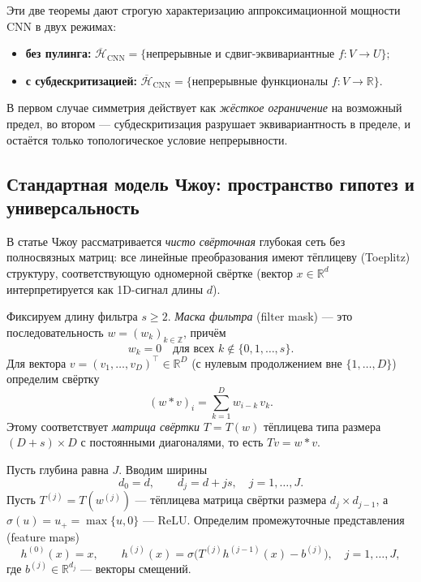 \documentclass[../NDCNNAI_main.tex]{subfiles}
\begin{document}
Эти две теоремы дают строгую характеризацию аппроксимационной мощности CNN
в двух режимах:
\begin{itemize}
  \item \textbf{без пулинга:} $\overline{\mathcal{H}}_{\mathrm{CNN}} = \{\text{непрерывные и сдвиг-эквивариантные } f\colon V\to U\};$
  \item \textbf{с субдескритизацией:} $\overline{\mathcal{H}}_{\mathrm{CNN}} = \{\text{непрерывные функционалы } f\colon V\to\mathbb{R}\}.$
\end{itemize}
В первом случае симметрия действует как \emph{жёсткое ограничение} на возможный предел,
во втором --- субдескритизация разрушает эквивариантность в пределе, и остаётся только топологическое условие непрерывности.

\subsection{Стандартная модель Чжоу: пространство гипотез и универсальность}
В статье Чжоу \cite{Zhou2018} рассматривается \emph{чисто свёрточная} глубокая сеть без полносвязных матриц:
все линейные преобразования имеют тёплицеву (Toeplitz) структуру, соответствующую одномерной свёртке
(вектор $x\in\mathbb R^d$ интерпретируется как 1D-сигнал длины $d$).

\begin{definition}
Фиксируем длину фильтра $s\ge 2$.
\emph{Маска фильтра} (filter mask) --- это последовательность $w=(w_k)_{k\in\mathbb Z}$, причём
\[
w_k=0\quad \text{для всех } k\notin\{0,1,\dots,s\}.
\]
Для вектора $v=(v_1,\dots,v_D)^\top\in\mathbb R^D$ (с нулевым продолжением вне $\{1,\dots,D\}$) определим свёртку
\[
(w*v)_i=\sum_{k=1}^{D} w_{i-k}\,v_k .
\]
Этому соответствует \emph{матрица свёртки} $T=T(w)$ тёплицева типа размера $(D+s)\times D$ с постоянными диагоналями,
то есть $Tv=w*v$.  
\end{definition}

\begin{definition}
Пусть глубина равна $J$. Вводим ширины
\[
d_0=d,\qquad d_j=d+js,\quad j=1,\dots,J.
\]
Пусть $T^{(j)}=T(w^{(j)})$ --- тёплицева матрица свёртки размера $d_j\times d_{j-1}$, а $\sigma(u)=u_+=\max\{u,0\}$
--- ReLU. Определим промежуточные представления (feature maps)
\[
h^{(0)}(x)=x,\qquad
h^{(j)}(x)=\sigma\big(T^{(j)}h^{(j-1)}(x)-b^{(j)}\big),\quad j=1,\dots,J,
\]
где $b^{(j)}\in\mathbb R^{d_j}$ --- векторы смещений.
\end{definition}
\end{document}

